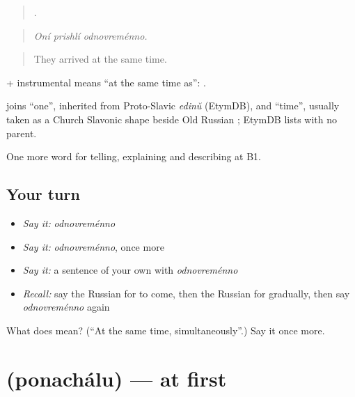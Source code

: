 \begin{quote}
  .
\end{quote}

\begin{quote}
\emph{Oní prishlí odnovreménno.}
\end{quote}

\begin{quote}
They arrived at the same time.
\end{quote}

\emph{ } + instrumental means \textquotedblleft{}at the same time as\textquotedblright{}: \emph{  }.

\begin{cousinweb}
\emph{} joins \emph{} \textquotedblleft{}one\textquotedblright{}, inherited from Proto-Slavic \emph{edinŭ} (EtymDB), and \emph{} \textquotedblleft{}time\textquotedblright{}, usually taken as a Church Slavonic shape beside Old Russian \emph{}; EtymDB lists \emph{} with no parent.
\end{cousinweb}

\begin{grammarlens}[title={What you've built}]
One more word for telling, explaining and describing at B1.
\end{grammarlens}

\subsection*{Your turn}
\begin{itemize}
\raggedright
  \item \emph{Say it:} \emph{odnovreménno}
  \item \emph{Say it:} \emph{odnovreménno}, once more
  \item \emph{Say it:} a sentence of your own with \emph{odnovreménno}
  \item \emph{Recall:} say the Russian for to come, then the Russian for gradually, then say \emph{odnovreménno} again
\end{itemize}

\begin{tcolorbox}[breakable,colback=teal!4,colframe=teal!35!black,title={Before you move on}]
What does  mean? (\textquotedblleft{}At the same time, simultaneously\textquotedblright{}.) Say it once more.
\end{tcolorbox}
\section[\texorpdfstring{\ru{поначалу} (ponachálu)}{поначалу (ponachálu)}]{ (ponachálu) — at first}

